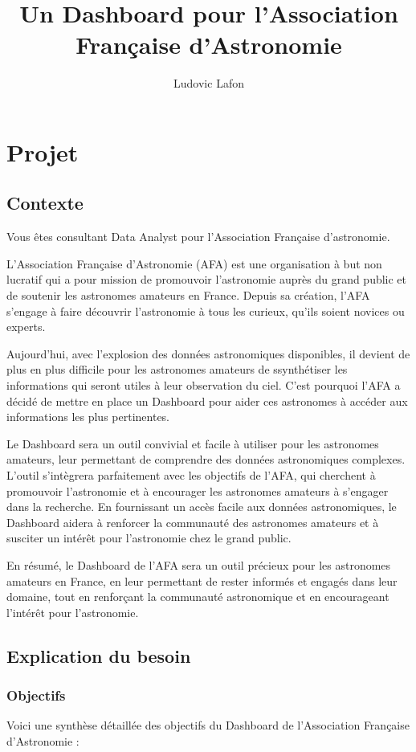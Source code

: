 \documentclass{article}
\title{Un Dashboard pour l'Association Française d'Astronomie}
\author{Ludovic Lafon}
\begin{document}
\maketitle
\tableofcontents
\section{Projet}
\subsection{Contexte}
Vous êtes consultant Data Analyst pour l'Association Française d'astronomie.

L'Association Française d'Astronomie (AFA) est une organisation à but non lucratif qui a pour mission de promouvoir l'astronomie auprès du grand public et de soutenir les astronomes amateurs en France. Depuis sa création, l'AFA s'engage à faire découvrir l'astronomie à tous les curieux, qu'ils soient novices ou experts.

Aujourd'hui, avec l'explosion des données astronomiques disponibles, il devient de plus en plus difficile pour les astronomes amateurs de ssynthétiser les informations qui seront utiles à leur observation du ciel. C'est pourquoi l'AFA a décidé de mettre en place un Dashboard pour aider ces astronomes à accéder aux informations les plus pertinentes.

Le Dashboard sera un outil convivial et facile à utiliser pour les astronomes amateurs, leur permettant  de comprendre des données astronomiques complexes. L'outil s'intègrera parfaitement avec les objectifs de l'AFA, qui cherchent à promouvoir l'astronomie et à encourager les astronomes amateurs à s'engager dans la recherche. En fournissant un accès facile aux données astronomiques, le Dashboard aidera à renforcer la communauté des astronomes amateurs et à susciter un intérêt pour l'astronomie chez le grand public.

En résumé, le Dashboard de l'AFA sera un outil précieux pour les astronomes amateurs en France, en leur permettant de rester informés et engagés dans leur domaine, tout en renforçant la communauté astronomique et en encourageant l'intérêt pour l'astronomie.
\subsection{Explication du besoin}
\subsubsection{Objectifs}
Voici une synthèse détaillée des objectifs du Dashboard de l'Association Française d'Astronomie :
\end{document}
